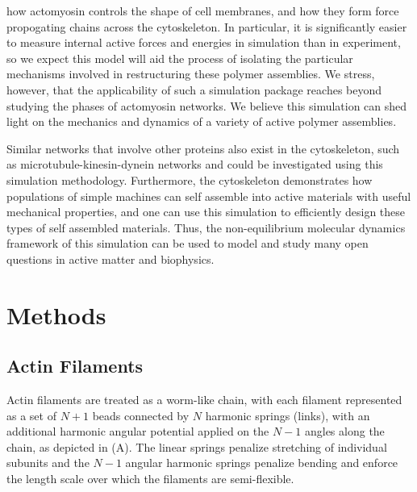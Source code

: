 \documentclass[12pt]{article}
\begin{document}
how actomyosin controls the shape of cell membranes, and how they form force
propogating chains across the cytoskeleton\cite{fraley2005,dasanyake2011}. 
In particular, it is significantly easier to measure internal active forces and
energies in simulation than in experiment, so we expect this model will aid the
process of isolating the particular mechanisms involved in restructuring these
polymer assemblies. We stress, however, that the applicability of such a
simulation package reaches beyond studying the phases of actomyosin networks.  
We believe this simulation can shed light on the mechanics and dynamics of 
a variety of active polymer assemblies.
\par
Similar networks that involve other proteins also exist in the
cytoskeleton, such as microtubule-kinesin-dynein networks and could be
investigated using this simulation methodology. Furthermore, the cytoskeleton
demonstrates how populations of simple machines can self assemble into active
materials with useful mechanical properties, and one can use this simulation to
efficiently design these types of self assembled materials. Thus, the
non-equilibrium molecular dynamics framework of this simulation can be used to
model and study many open questions in active matter and biophysics.
\section{Methods}  
\subsection{Actin Filaments}
Actin filaments are treated as a worm-like chain, with each filament represented as a set of $N+1$ beads connected by $N$ harmonic springs (links), with an additional harmonic angular potential applied on the $N-1$ angles along the chain, as depicted in (A). The linear springs 
penalize stretching of individual subunits and the $N-1$ angular harmonic springs penalize bending and enforce the length scale over which the filaments are semi-flexible. 
\end{document}
